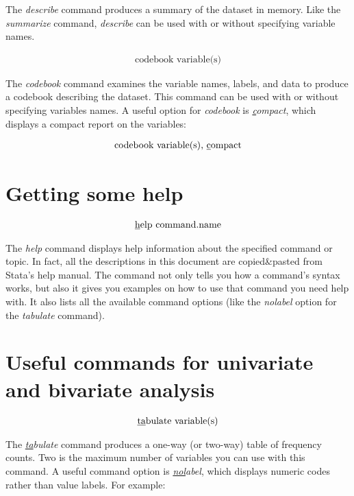 \documentclass[paper=a4, fontsize=11pt]{scrartcl} %
\numberwithin{equation}{section} %
\numberwithin{figure}{section} %
\numberwithin{table}{section} %
\begin{document}
The \textit{describe} command produces a summary of the dataset in memory. Like the \textit{summarize} command, \textit{describe} can be used with or without specifying variable names.

\begin{align}
	\text{codebook variable(s)}
\end{align}

The \textit{codebook} command examines the variable names, labels, and data to produce a codebook describing the dataset. This command can be used with or without specifying variables names. A useful option for \textit{codebook} is \textit{\underline{c}ompact}, which displays a compact report on the variables:

\begin{align}
	\text{codebook variable(s), \underline{c}ompact}
\end{align}


\section{Getting some help}

\begin{align}
	\text{\underline{h}elp command.name} 
\end{align}

The \textit{help} command displays help information about the specified command or topic. In fact, all the descriptions in this document are copied\&pasted from Stata's help manual. The  command not only tells you how a command's syntax works, but also it gives you examples on how to use that command you need help with. It also lists all the available command options (like the \textit{nolabel} option for the \textit{tabulate} command). 
 

\section{Useful commands for univariate and bivariate analysis}

\begin{align}
	\text{\underline{ta}bulate variable(s)}
\end{align}

The \textit{\underline{ta}bulate} command produces a one-way (or two-way) table of frequency counts. Two is the maximum number of variables you can use with this command. A useful command option is \textit{\underline{nol}abel}, which displays numeric codes rather than value labels. For example:
\end{document}
